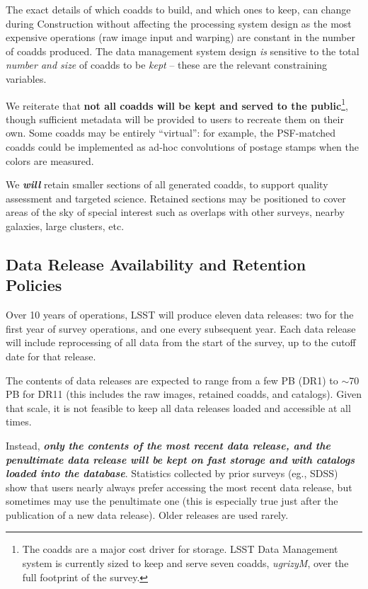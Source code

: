 The exact details of which coadds to build, and which ones to keep, can change during Construction without affecting the processing system design as the most expensive operations (raw image input and warping) are constant in the number of coadds produced. The data management system design \emph{is} sensitive to the total \emph{number and size} of coadds to be \emph{kept} -- these are the relevant constraining variables.

We reiterate that \textbf{not all coadds will be kept and served to the public}\footnote{The coadds are a major cost driver for storage. LSST Data Management system is currently sized to keep and serve seven coadds, \emph{ugrizyM}, over the full footprint of the survey.}, though sufficient metadata will be provided to users to recreate them on their own. Some coadds may be entirely ``virtual'': for example, the PSF-matched coadds could be implemented as ad-hoc convolutions of postage stamps when the colors are measured.

We \emph\textbf{will} retain smaller sections of all generated coadds, to support quality assessment and targeted science. Retained sections may be positioned to cover areas of the sky of special interest such as overlaps with other surveys, nearby galaxies, large clusters, etc.

\subsection{Data Release Availability and Retention Policies}
\label{sec:retention}

Over 10 years of operations, LSST will produce eleven data releases: two for the first year of survey operations, and one every subsequent year. Each data release will include reprocessing of all data from the start of the survey, up to the cutoff date for that release.

The contents of data releases are expected to range from a few PB (DR1) to $\sim$70\,PB for DR11 (this includes the raw images, retained coadds, and catalogs). Given that scale, it is not feasible to keep all data releases loaded and accessible at all times.

Instead, \textbf{\emph{only the contents of the most recent data release, and the penultimate data release will be kept on fast storage and with catalogs loaded into the database}}.  Statistics collected by prior surveys (eg., SDSS) show that users nearly always prefer accessing the most recent data release, but sometimes may use the penultimate one (this is especially true just after the publication of a new data release). Older releases are used rarely.

